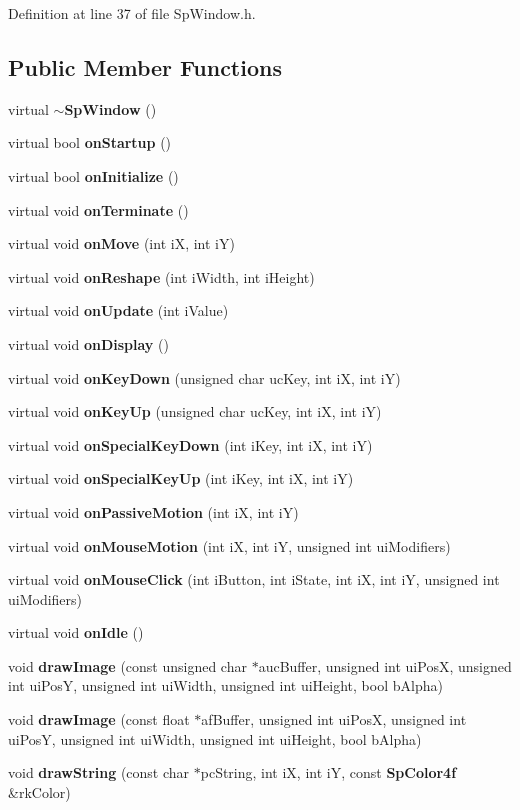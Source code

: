 Definition at line 37 of file Sp\-Window.h.\subsection*{Public Member Functions}
\begin{CompactItemize}
\item 
virtual {\bf $\sim$Sp\-Window} ()
\item 
virtual bool {\bf on\-Startup} ()
\item 
virtual bool {\bf on\-Initialize} ()
\item 
virtual void {\bf on\-Terminate} ()
\item 
virtual void {\bf on\-Move} (int i\-X, int i\-Y)
\item 
virtual void {\bf on\-Reshape} (int i\-Width, int i\-Height)
\item 
virtual void {\bf on\-Update} (int i\-Value)
\item 
virtual void {\bf on\-Display} ()
\item 
virtual void {\bf on\-Key\-Down} (unsigned char uc\-Key, int i\-X, int i\-Y)
\item 
virtual void {\bf on\-Key\-Up} (unsigned char uc\-Key, int i\-X, int i\-Y)
\item 
virtual void {\bf on\-Special\-Key\-Down} (int i\-Key, int i\-X, int i\-Y)
\item 
virtual void {\bf on\-Special\-Key\-Up} (int i\-Key, int i\-X, int i\-Y)
\item 
virtual void {\bf on\-Passive\-Motion} (int i\-X, int i\-Y)
\item 
virtual void {\bf on\-Mouse\-Motion} (int i\-X, int i\-Y, unsigned int ui\-Modifiers)
\item 
virtual void {\bf on\-Mouse\-Click} (int i\-Button, int i\-State, int i\-X, int i\-Y, unsigned int ui\-Modifiers)
\item 
virtual void {\bf on\-Idle} ()
\item 
void {\bf draw\-Image} (const unsigned char $\ast$auc\-Buffer, unsigned int ui\-Pos\-X, unsigned int ui\-Pos\-Y, unsigned int ui\-Width, unsigned int ui\-Height, bool b\-Alpha)
\item 
void {\bf draw\-Image} (const float $\ast$af\-Buffer, unsigned int ui\-Pos\-X, unsigned int ui\-Pos\-Y, unsigned int ui\-Width, unsigned int ui\-Height, bool b\-Alpha)
\item 
void {\bf draw\-String} (const char $\ast$pc\-String, int i\-X, int i\-Y, const {\bf Sp\-Color4f} \&rk\-Color)
\item 

\end{CompactItemize}
